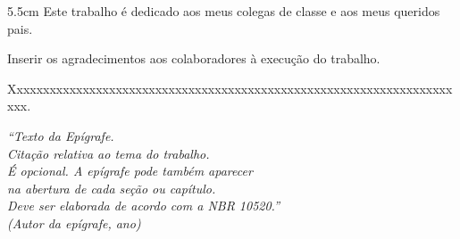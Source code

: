 \begin{folhadeaprovacao}
	\vspace*{\baselineskip}

	\vspace*{\baselineskip}

	\vspace*{\baselineskip}

\end{folhadeaprovacao}

\begin{dedicatoria}
	\vspace*{\fill}
	\noindent
	\begin{adjustwidth*}{}{5.5cm}     
		Este trabalho é dedicado aos meus colegas de classe e aos meus queridos pais.
	\end{adjustwidth*}
\end{dedicatoria}

\begin{agradecimentos}
	Inserir os agradecimentos aos colaboradores à execução do trabalho. 
	
	Xxxxxxxxxxxxxxxxxxxxxxxxxxxxxxxxxxxxxxxxxxxxxxxxxxxxxxxxxxxxxxxxxxxxxx. 
\end{agradecimentos}

\begin{epigrafe}
	\vspace*{\fill}
	\begin{flushright}
		\textit{``Texto da Epígrafe.\\
			Citação relativa ao tema do trabalho.\\
			É opcional. A epígrafe pode também aparecer\\
			na abertura de cada seção ou capítulo.\\
			Deve ser elaborada de acordo com a NBR 10520.''\\
			(Autor da epígrafe, ano)}
	\end{flushright}
\end{epigrafe}

